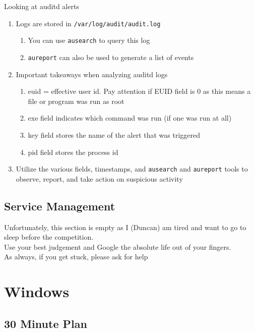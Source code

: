 \documentclass[12pt,letterpaper]{article}
\def\code#1{\textcolor{iris}{\texttt{#1}}}
\begin{document}
Looking at auditd alerts
\begin{enumerate}
	\item Logs are stored in \code{/var/log/audit/audit.log}
		\begin{enumerate}
			\item You can use \code{ausearch} to query this log
			\item \code{aureport} can also be used to generate a list of events
		\end{enumerate}
	\item Important takeaways when analyzing auditd logs
		\begin{enumerate}
			\item euid = effective user id. Pay attention if EUID field is 0 as this means a file or program was run as root
			\item exe field indicates which command was run (if one was run at all)
			\item key field stores the name of the alert that was triggered
			\item pid field stores the process id
		\end{enumerate}
	\item Utilize the various fields, timestamps, and \code{ausearch} and \code{aureport} tools to observe, report, and take action on suspicious activity
\end{enumerate}

\subsection{Service Management}

Unfortunately, this section is empty as I (Duncan) am tired and want to go to sleep before the competition. \\
Use your best judgement and Google the absolute life out of your fingers. \\
As always, if you get stuck, please ask for help

\pagebreak

\section{Windows}

\subsection{30 Minute Plan}
\end{document}
